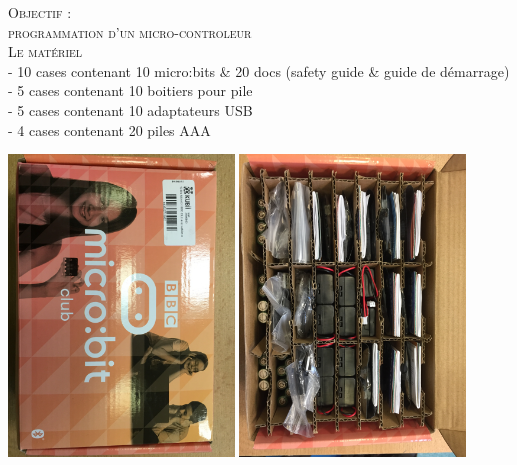 \documentclass[a4paper, 11pt]{article}           %
\newcommand{\objectif}[1]{\textsc{\huge #1} }
\newcommand{\partie}[1]{\textsc{\huge #1} }
\begin{document}
\sffamily
\objectif{Objectif :\\programmation d'un micro-controleur}\\


\partie{Le matériel} \\ %
- 10 cases contenant 10 {micro:bits \& 20 docs (safety guide \& guide de démarrage)}\\
- 5 cases contenant 10 boitiers pour pile \\
- 5 cases contenant 10 adaptateurs USB\\
- 4 cases contenant 20 piles AAA
\begin{center}
\includegraphics[width=0.45\textwidth]{boite_fermee}
\includegraphics[width=0.45\textwidth]{boite_ouverte}
\end{center}
\end{document}
